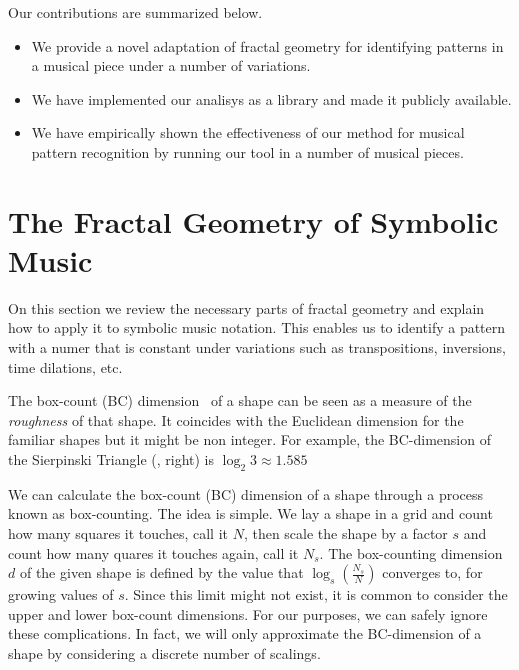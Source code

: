   Our contributions are summarized below.

\begin{itemize}
  \item We provide a novel adaptation of fractal geometry for identifying patterns
        in a musical piece under a number of variations.
  \item We have implemented our analisys as a library and made it publicly available.
  \item We have empirically shown the effectiveness of our method for musical pattern
        recognition by running our tool in a number of musical pieces.
\end{itemize}

\section{The Fractal Geometry of Symbolic Music}
\label{sec:fractal-geom}

  On this section we review the necessary parts of fractal geometry
and explain how to apply it to symbolic music notation. This enables
us to identify a pattern with a numer that is constant under
variations such as transpositions, inversions, time dilations, etc.

  The box-count (BC) dimension~\cite{bouligand1928ensembles} of a shape
can be seen as a measure of the \emph{roughness} of that shape. It coincides with the
Euclidean dimension for the familiar shapes but it might be non integer. For example,
the BC-dimension of the Sierpinski Triangle (, right) is $\log_2 3 \approx 1.585$

  We can calculate the box-count (BC) dimension of a shape through a
process known as box-counting. The idea is simple. We lay a shape in a
grid and count how many squares it touches, call it $N$, then scale
the shape by a factor $s$ and count how many quares it touches again,
call it $N_s$. The box-counting dimension $d$ of the given shape is
defined by the value that $\log_s(\frac{N_s}{N})$ converges to, for
growing values of $s$.  Since this limit might not exist, it is common
to consider the upper and lower box-count dimensions.  For our
purposes, we can safely ignore these complications. In fact, we will
only approximate the BC-dimension of a shape by considering a discrete
number of scalings. 


